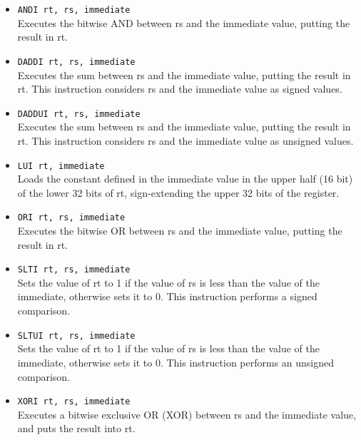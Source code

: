 \documentclass[12pt]{report}
\begin{document}
\begin{itemize}
	\item \texttt{ANDI rt, rs, immediate}\\
	Executes the bitwise AND between rs and the immediate value, putting the
	result in rt.

	\item \texttt{DADDI rt, rs, immediate}\\
	Executes the sum between rs and the immediate value, putting the result in
	rt. This instruction considers rs and the immediate value as signed
	values.

	\item \texttt{DADDUI rt, rs, immediate}\\
	Executes the sum between rs and the immediate value, putting the result in
	rt. This instruction considers rs and the immediate value as unsigned
	values.

	\item \texttt{LUI rt, immediate}\\
	Loads the constant defined in the immediate value in the upper half (16 bit) of the
	lower 32 bits of rt, sign-extending the upper 32 bits of the register.

	\item \texttt{ORI rt, rs, immediate}\\
	Executes the bitwise OR between rs and the immediate value, putting the
	result in rt.

	\item \texttt{SLTI rt, rs, immediate}\\
	Sets the value of rt to 1 if the value of rs is less than the value of the
	immediate, otherwise sets it to 0. This instruction performs a signed comparison.

	\item \texttt{SLTUI rt, rs, immediate}\\
	Sets the value of rt to 1 if the value of rs is less than the value of the
	immediate, otherwise sets it to 0. This instruction performs an unsigned comparison.

	\item \texttt{XORI rt, rs, immediate}\\
	Executes a bitwise exclusive OR (XOR) between rs and the immediate value,
	and puts the result into rt.

\end{itemize}
\end{document}
